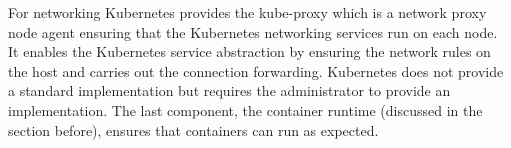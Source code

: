 For networking Kubernetes provides the kube-proxy which is a network proxy node agent ensuring that the Kubernetes networking services run on each node. It enables the Kubernetes service abstraction by ensuring the network rules on the host and carries out the connection forwarding. Kubernetes does not provide a standard implementation but requires the administrator to provide an implementation. The last component, the container runtime (discussed in the section before), ensures that containers can run as expected.\\[0.5mm]



